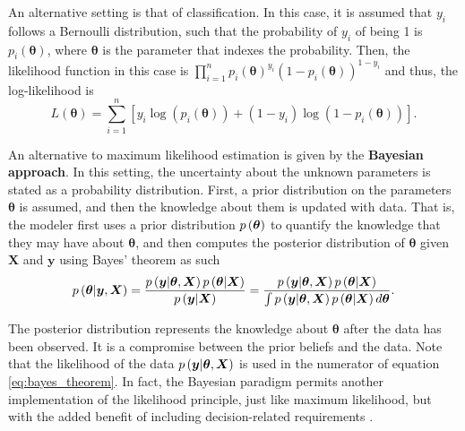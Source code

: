 
An alternative setting is that of classification. In this case, it is assumed that $y_i$ follows a Bernoulli distribution, such that the probability of $y_i$ of being 1 is $p_i(\boldsymbol{\theta})$, where $\boldsymbol{\theta}$ is the parameter that indexes the probability. Then, the likelihood function in this case is $\prod_{i = 1}^n  p_i(\boldsymbol{\theta})^{y_i}\left(1 - p_i(\boldsymbol{\theta}) \right)^{1 - y_i}$ and thus, the log-likelihood is
\begin{equation}
  L(\boldsymbol{\theta}) = \sum_{i = 1}^n \left[ y_i \log\left( p_i(\boldsymbol{\theta}) \right) + (1 - y_i) \log \left( 1 - p_i(\boldsymbol{\theta}) \right) \right].
\end{equation}

An alternative to maximum likelihood estimation is given by the \textbf{Bayesian approach}. In this setting, the uncertainty about the unknown parameters is stated as a probability distribution.
First, a prior distribution on the parameters $\boldsymbol{\theta}$ is assumed, and then the knowledge about them is updated with data. That is, the modeler first uses a prior distribution $p\left( \boldsymbol{\theta} \right)$ to quantify the knowledge that they may have about $\boldsymbol{\theta}$, and then computes the posterior distribution of $\boldsymbol{\theta}$ given $\boldsymbol{X}$ and $\boldsymbol{y}$ using Bayes' theorem as such
\begin{equation}
  \label{eq:bayes_theorem}
  p\left( \boldsymbol{\theta} | \boldsymbol{y}, \boldsymbol{X}  \right) =
  \frac{p\left( \boldsymbol{y} | \boldsymbol{\theta}, \boldsymbol{X} \right) p\left( \boldsymbol{\theta} | \boldsymbol{X} \right)}{p\left( \boldsymbol{y} | \boldsymbol{X} \right)} =
  \frac{p\left( \boldsymbol{y} | \boldsymbol{\theta}, \boldsymbol{X} \right) p\left( \boldsymbol{\theta} | \boldsymbol{X} \right)}{\int p\left( \boldsymbol{y} | \boldsymbol{\theta}, \boldsymbol{X} \right) p\left( \boldsymbol{\theta} | \boldsymbol{X} \right) d\boldsymbol{\theta}}.
\end{equation}

The posterior distribution represents the knowledge about $\boldsymbol{\theta}$ after the data has been observed. It is a compromise between the prior beliefs and the data. Note that the likelihood of the data $p\left( \boldsymbol{y} | \boldsymbol{\theta}, \boldsymbol{X} \right)$ is used in the numerator of equation \eqref{eq:bayes_theorem}. In fact, the Bayesian paradigm permits another implementation of the likelihood principle, just like maximum likelihood, but with the added benefit of including decision-related requirements \cite{robert2007bayesian}.

